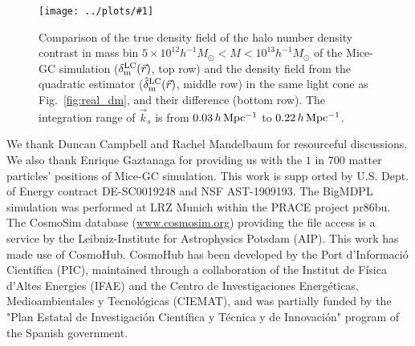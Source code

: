 \documentclass[prd,amsmath,amssymb,floatfix,superscriptaddress,nofootinbib,twocolumn]{revtex4-1}
\newcommand{\vrr}{\vec{r}}
\newcommand{\vk}{\vec{k}}
\newcommand{\rf}[1]{\ref{fig:#1}}
\newcommand{\sfig}[2]{
\texttt{[image: ../plots/\#1]}
        }
\newcommand{\Sfig}[2]{
   \begin{figure}[thbp]
   \begin{center}
    \sfig{../plots/#1.pdf}{\columnwidth}
    \caption{{\small #2}}
    \label{fig:#1}
     \end{center}
   \end{figure}
}
\begin{document}
\Sfig{real_halo}{Comparison of the true density field of the halo number density contrast in mass bin $5 \times 10^{12}h^{-1}M_{\odot}<M < 10^{13}h^{-1}M_{\odot}$ of the Mice-GC simulation ($\delta^{\rm LC}_{\rm m}(\vrr)$, top row) and the density field from the quadratic estimator ($\hat{\delta}_{\rm m}^{\rm LC}(\vrr)$, middle row) in the same light cone as Fig.~\rf{real_dm}, and their difference (bottom row). The integration range of $\vk_{s}$ is from $0.03\, h \rm \, Mpc^{-1}$ to $0.22\, h \rm \, Mpc^{-1}$.} 


\acknowledgements
We thank Duncan Campbell and Rachel Mandelbaum for resourceful discussions. We also thank Enrique Gaztanaga for providing us with the $1$ in $700$ matter particles' positions of Mice-GC simulation. This work is supp orted by U.S. Dept. of Energy contract DE-SC0019248 and NSF AST-1909193.
The BigMDPL simulation was performed at LRZ Munich within the PRACE project pr86bu. The CosmoSim database (\url{www.cosmosim.org}) providing the file access is a service by the Leibniz-Institute for Astrophysics Potsdam (AIP).
This work has made use of CosmoHub. CosmoHub has been developed by the Port d'Informació Científica (PIC), maintained through a collaboration of the Institut de Física d'Altes Energies (IFAE) and the Centro de Investigaciones Energéticas, Medioambientales y Tecnológicas (CIEMAT), and was partially funded by the "Plan Estatal de Investigación Científica y Técnica y de Innovación" program of the Spanish government.
\clearpage

\end{document}

